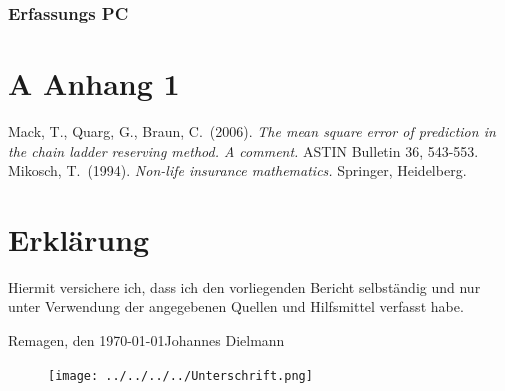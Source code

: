 \documentclass[11pt,twoside]{report}
\begin{document}
\subsubsection{Erfassungs PC}
\newpage

\section*{A Anhang 1}
\newpage

\begin{thebibliography}{99}
 Mack, T., Quarg, G., Braun, C.\ (2006). {\em The mean square error of prediction in the chain ladder reserving method. A comment.} ASTIN Bulletin 36, 543-553. 
 Mikosch, T.\ (1994). {\em Non-life insurance mathematics.} Springer, Heidelberg.
\end{thebibliography}
\newpage

\section*{Erklärung}

\vspace{2cm}

Hiermit versichere ich, dass ich den vorliegenden Bericht selbständig und nur unter Verwendung der angegebenen Quellen und Hilfsmittel verfasst habe.

\vspace{2cm}

Remagen, den \today \hfill {Johannes Dielmann} 
\begin{figure}[hp]
	\hfill
	\texttt{[image: ../../../../Unterschrift.png]}
\end{figure}
\end{document}
